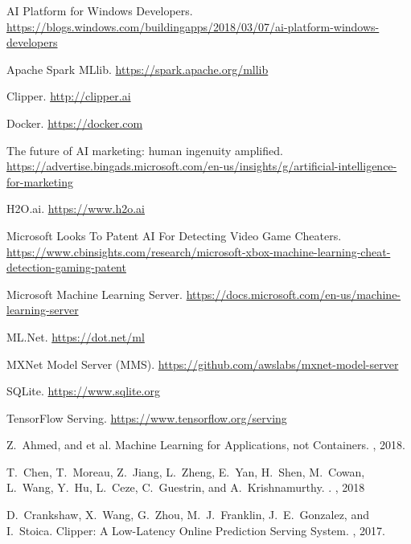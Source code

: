 \documentclass[11pt]{article}
\begin{document}
\itemsep=1pt 
\begin{small}
\begin{thebibliography}{10}

AI Platform for Windows Developers.
\newblock \url{https://blogs.windows.com/buildingapps/2018/03/07/ai-platform-windows-developers}

Apache Spark MLlib.
\newblock \url{https://spark.apache.org/mllib}

{Clipper.}
\newblock \url{http://clipper.ai}

Docker.
\newblock \url{https://docker.com}

The future of AI marketing: human ingenuity amplified.
\newblock \url{https://advertise.bingads.microsoft.com/en-us/insights/g/artificial-intelligence-for-marketing}

H2O.ai.
\newblock \url{https://www.h2o.ai}

Microsoft Looks To Patent AI For Detecting Video Game Cheaters.
\newblock \url{https://www.cbinsights.com/research/microsoft-xbox-machine-learning-cheat-detection-gaming-patent}

{Microsoft Machine Learning Server}.
\newblock
\url{https://docs.microsoft.com/en-us/machine-learning-server}

{{ML.N}et}.
\newblock
 \url{https://dot.net/ml}

{MXN}et {M}odel {S}erver ({MMS}).
\newblock \url{https://github.com/awslabs/mxnet-model-server}

SQLite.
\newblock \url{https://www.sqlite.org}

{Tensor{F}low Serving.}
\newblock \url{https://www.tensorflow.org/serving}

Z.~Ahmed, and et al.
\newblock Machine Learning for Applications, not Containers.
, 2018.

T.~Chen, T.~Moreau, Z.~Jiang, L.~Zheng, E.~Yan, H.~Shen, M.~Cowan, L.~Wang, Y.~Hu, L.~Ceze, C.~Guestrin, and A.~Krishnamurthy.
.
, 2018

D.~Crankshaw, X.~Wang, G.~Zhou, M.~J.~Franklin, J.~E.~Gonzalez, and I.~Stoica.
\newblock Clipper: {A} Low-Latency Online Prediction Serving System.
, 2017.


\end{thebibliography}
\end{small}
\end{document}
